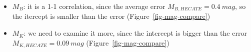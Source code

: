 \documentclass[
]{article}
\providecommand{\tightlist}{%
  \setlength{\itemsep}{0pt}\setlength{\parskip}{0pt}}\usepackage{longtable,booktabs,array}
\begin{document}
\begin{itemize}
\tightlist
\item
  \(M_B\): it is a 1-1 correlation, since the average error
  \(M_{B,HECATE} = 0.4\ mag\), so the itercept is smaller than the error
  (Figure~\ref{fig-mag-compare})
\item
  \(M_K\): we need to examine it more, since the intercept is bigger
  than the error \(M_{K,HECATE} = 0.09\ mag\)
  (Figure~\ref{fig-mag-compare})
\end{itemize}

\begin{figure}

\begin{minipage}{0.50\linewidth}



\end{minipage}%
%
\begin{minipage}{0.50\linewidth}

\end{minipage}
\end{figure}
\end{document}
